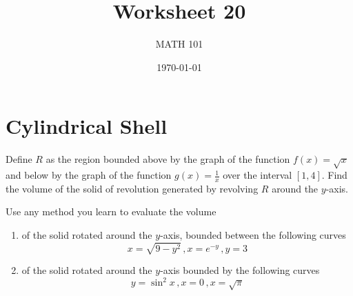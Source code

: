 \documentclass[12pt]{amsart}
\title{ Worksheet 20}
\author{MATH 101}
\date{\today}
\begin{document}
\maketitle

\section*{Cylindrical Shell}

\begin{problem}
Define $R$ as the region bounded above by the graph of the function $f(x)=\sqrt{x}$ and below by the graph of the function $g(x)=\frac{1}{x}$ over the interval $[1,4]$. Find the volume of the solid of revolution generated by revolving $R$ around the $y$-axis.
\end{problem}

\newpage

\begin{problem}
Use any method you learn to evaluate the volume
\begin{enumerate}
	\item  of the solid rotated around the $y$-axis, bounded between the following curves
	      $$ x = \sqrt{9 - y^2} \,,  x= e^{-y} \,, y = 3$$
	      \vspace{7cm}
	\item of the solid rotated around the $y$-axis bounded by the following curves
	      $$ y = \sin^2 x \,, x = 0 \,, x = \sqrt{\pi} $$
	      \vspace{7cm}
\end{enumerate}
\end{problem}
\end{document}
